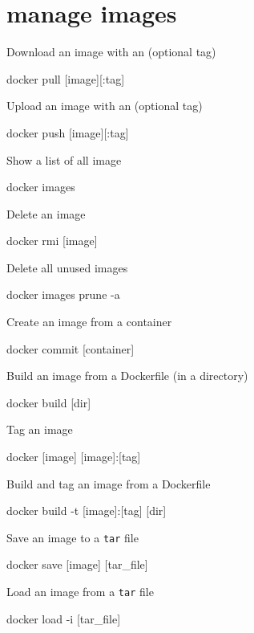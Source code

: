 \documentclass{refcard}
\begin{document}
\section{manage images}

Download an image with an (optional tag)
\begin{ttyenv}
docker pull [image][:tag]
\end{ttyenv}

Upload an image with an (optional tag)
\begin{ttyenv}
docker push [image][:tag]
\end{ttyenv}

Show a list of all image
\begin{ttyenv}
docker images
\end{ttyenv}

Delete an image
\begin{ttyenv}
docker rmi [image]
\end{ttyenv}

Delete all unused images
\begin{ttyenv}
docker images prune -a
\end{ttyenv}

Create an image from a container
\begin{ttyenv}
docker commit [container]
\end{ttyenv}

Build an image from a Dockerfile (in a directory)
\begin{ttyenv}
docker build [dir]
\end{ttyenv}

Tag an image
\begin{ttyenv}
docker [image] [image]:[tag]
\end{ttyenv}

Build and tag an image from a Dockerfile
\begin{ttyenv}
docker build -t [image]:[tag] [dir]
\end{ttyenv}

Save an image to a \verb|tar| file
\begin{ttyenv}
docker save [image] [tar_file]
\end{ttyenv}

Load an image from a \verb|tar| file
\begin{ttyenv}
docker load -i [tar_file]
\end{ttyenv}

\end{document}
